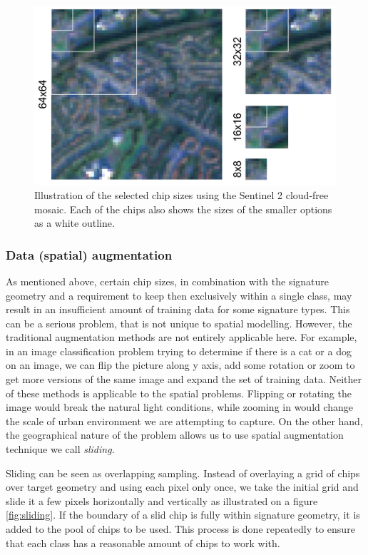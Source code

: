\begin{figure}
    \centering
    \includegraphics[width=.8\linewidth]{fig/chips.png}
    \caption{Illustration of the selected chip sizes using the Sentinel 2 cloud-free mosaic. Each of the chips also shows the sizes of the smaller options as a white outline.}
    \label{fig:chips}
\end{figure}



\subsubsection{Data (spatial) augmentation}



As mentioned above, certain chip sizes, in combination with the signature geometry and a
requirement to keep then exclusively within a single class, may result in an
insufficient amount of training data for some signature types. This can be a serious
problem, that is not unique to spatial modelling. However, the traditional augmentation
methods are not entirely applicable here. For example, in an image classification
problem trying to determine if there is a cat or a dog on an image, we can flip the
picture along y axis, add some rotation or zoom to get more versions of the same image
and expand the set of training data. Neither of these methods is applicable to the
spatial problems. Flipping or rotating the image would break the natural light
conditions, while zooming in would change the scale of urban environment we are
attempting to capture. On the other hand, the geographical nature of the problem allows
us to use spatial augmentation technique we call \textit{sliding}.

Sliding can be seen as overlapping sampling. Instead of overlaying a grid of chips over
target geometry and using each pixel only once, we take the initial grid and slide it a
few pixels horizontally and vertically as illustrated on a figure \ref{fig:sliding}. If
the boundary of a slid chip is fully within signature geometry, it is added to the pool
of chips to be used. This process is done repeatedly to ensure that each class has a
reasonable amount of chips to work with.

